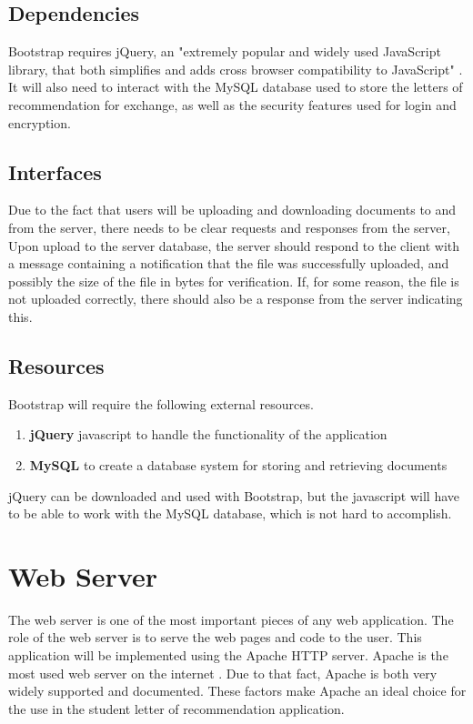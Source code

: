 \documentclass[onecolumn, draftclsnofoot,10pt, compsoc]{IEEEtran}
\begin{document}
\subsection{Dependencies}
Bootstrap requires jQuery, an "extremely popular and widely used JavaScript library, that both simplifies and adds cross browser compatibility to JavaScript" \cite{rascia}. It will also need to interact with the MySQL database used to store the letters of recommendation for exchange, as well as the security features used for login and encryption.

\subsection{Interfaces}
Due to the fact that users will be uploading and downloading documents to and from the server, there needs to be clear requests and responses from the server, Upon upload to the server database, the server should respond to the client with a message containing a notification that the file was successfully uploaded, and possibly the size of the file in bytes for verification. If, for some reason, the file is not uploaded correctly, there should also be a response from the server indicating this.

\subsection{Resources}
Bootstrap will require the following external resources.
\begin{enumerate}
    \item \textbf{jQuery} javascript to handle the functionality of the application
    \item \textbf{MySQL} to create a database system for storing and retrieving documents
\end{enumerate}

jQuery can be downloaded and used with Bootstrap, but the javascript will have to be able to work with the MySQL database, which is not hard to accomplish.


\section{Web Server}
The web server is one of the most important pieces of any web application. The role of the web server is to serve the web pages and code to the user. This application will be implemented using the Apache HTTP server. Apache is the most used web server on the internet \cite{webserverstats}. Due to that fact, Apache is both very widely supported and documented. These factors make Apache an ideal choice for the use in the student letter of recommendation application.
\end{document}

